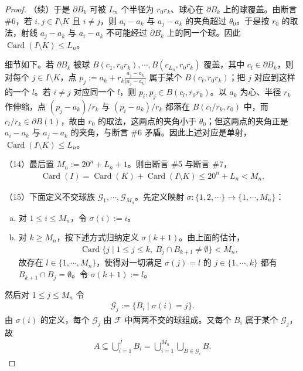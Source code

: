 \documentclass[../../main.tex]{subfiles}%
\begin{document}
\begin{proof}
（续）于是 $\partial B_k$ 可被 $L_n$ 个半径为 $r_0r_k$、球心在 $\partial B_k$ 上的球覆盖。由断言 \#6，若 $i,j\in I\setminus K$ 且 $i\neq j$，则 $a_i-a_k$ 与 $a_j-a_k$ 的夹角超过 $\theta_0$。于是按 $r_0$ 的取法，射线 $a_j-a_k$ 与 $a_i-a_k$ 不可能经过 $\partial B_k$ 上的同一个球。因此 $\operatorname{Card}(I\setminus K)\leqslant L_n$。

细节如下。若 $\partial B_k$ 被球 $B(c_1,r_0r_k),\cdots,B(c_{L_n},r_0r_k)$ 覆盖，其中 $c_l\in\partial B_k$，则对每个 $j\in I\setminus K$，点 $p_j:=a_k+r_k\frac{a_j-a_k}{\lvert a_j-a_k\rvert}$ 属于某个 $B(c_l,r_0r_k)$；把 $j$ 对应到这样的一个 $l$。若 $i\neq j$ 对应同一个 $l$，则 $p_i,p_j\in B(c_l,r_0r_k)$。以 $a_k$ 为心、半径 $r_k$ 作伸缩，点 $(p_j-a_k)/r_k$ 与 $(p_i-a_k)/r_k$ 都落在 $B(c_l/r_k,r_0)$ 中，而 $c_l/r_k\in\partial B(1)$，故由 $r_0$ 的取法，这两点的夹角小于 $\theta_0$；但这两点的夹角正是 $a_i-a_k$ 与 $a_j-a_k$ 的夹角，与断言 \#6 矛盾。因此上述对应是单射，$\operatorname{Card}(I\setminus K)\leqslant L_n$。

（14）最后置 $M_n:=20^{n}+L_n+1$。则由断言 \#5 与断言 \#7，
\begin{align*}
\operatorname{Card}(I)=\operatorname{Card}(K)+\operatorname{Card}(I\setminus K)\leqslant20^{n}+L_n<M_n .
\end{align*}

（15）下面定义不交球族 $\mathcal{G}_1,\cdots,\mathcal{G}_{M_n}$。先定义映射 $\sigma:\{1,2,\cdots\}\to\{1,\cdots,M_n\}$：
\begin{enumerate}[(a)]
\item 对 $1\leqslant i\leqslant M_n$，令 $\sigma(i):=i$。
\item 对 $k\geqslant M_n$，按下述方式归纳定义 $\sigma(k+1)$。由上面的估计，
\begin{align*}
\operatorname{Card}\{j\mid 1\leqslant j\leqslant k,\ B_j\cap B_{k+1}\neq\emptyset\}<M_n,
\end{align*}
故存在 $l\in\{1,\cdots,M_n\}$，使得对一切满足 $\sigma(j)=l$ 的 $j\in\{1,\cdots,k\}$ 都有 $B_{k+1}\cap B_j=\emptyset$。令 $\sigma(k+1):=l$。
\end{enumerate}
然后对 $1\leqslant j\leqslant M_n$ 令
\begin{align*}
\mathcal{G}_j:=\{B_i\mid\sigma(i)=j\}.
\end{align*}
由 $\sigma(i)$ 的定义，每个 $\mathcal{G}_j$ 由 $\mathcal{F}$ 中两两不交的球组成。又每个 $B_i$ 属于某个 $\mathcal{G}_j$，故
\begin{align*}
A\subseteq\bigcup_{i=1}^{J}B_i=\bigcup_{i=1}^{M_n}\bigcup_{B\in\mathcal{G}_i}B .
\end{align*}


\end{proof}
\end{document}
